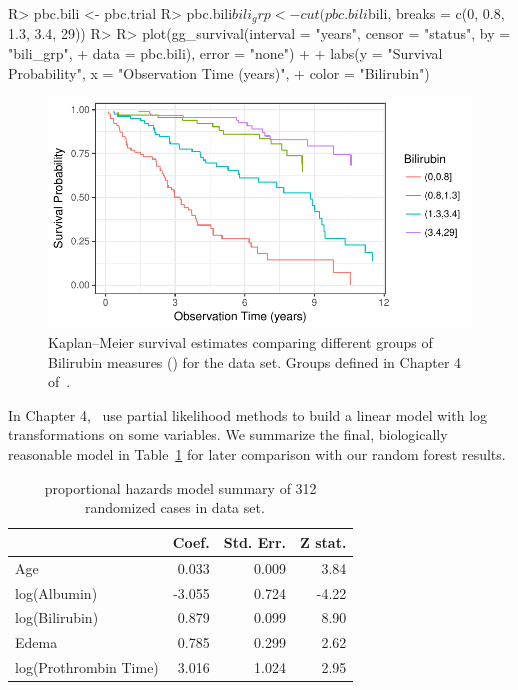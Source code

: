 \documentclass[nojss]{jss}
\begin{document}
\begin{Schunk}
\begin{Sinput}
R> pbc.bili <- pbc.trial
R> pbc.bili$bili_grp <- cut(pbc.bili$bili, breaks = c(0, 0.8, 1.3, 3.4, 29))
R> 
R> plot(gg_survival(interval = "years", censor = "status", by = "bili_grp",
+                  data = pbc.bili), error = "none") +
+   labs(y = "Survival Probability", x = "Observation Time (years)",
+        color = "Bilirubin")
\end{Sinput}
\begin{figure}[!htb]

{\centering \includegraphics[width=\maxwidth]{fig-rfs/rfs-gg_survival-bili-1} 

}

\caption{Kaplan--Meier survival estimates comparing different groups of Bilirubin measures () for the  data set. Groups defined in Chapter 4 of~\cite{fleming:1991}.}\label{fig:gg_survival-bili}
\end{figure}
\end{Schunk}

In Chapter 4,~\cite{fleming:1991} use partial likelihood methods to build a linear model with log transformations on some variables. We summarize the final, biologically reasonable model in Table~\ref{T:FHmodel} for later comparison with our random forest results.

\begin{table}

\caption{\label{tab:xtab}\label{T:FHmodel} proportional hazards model summary of 312 randomized cases in  data set. ~\citep[Table 4.4.3c]{fleming:1991} }
\centering
\begin{tabular}[t]{lrrr}
\toprule
  & Coef. & Std. Err. & Z stat.\\
\midrule
Age & 0.033 & 0.009 & 3.84\\
log(Albumin) & -3.055 & 0.724 & -4.22\\
log(Bilirubin) & 0.879 & 0.099 & 8.90\\
Edema & 0.785 & 0.299 & 2.62\\
log(Prothrombin Time) & 3.016 & 1.024 & 2.95\\
\bottomrule
\end{tabular}
\end{table}
\end{document}
